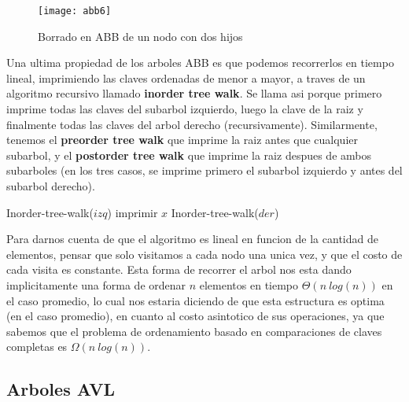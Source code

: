 \documentclass[10pt,a4paper]{article}
\begin{document}
\begin{figure}[h]
	\centering
	\texttt{[image: abb6]}
	\caption{Borrado en ABB de un nodo con dos hijos}
	\label{drivers1}
\end{figure}


Una ultima propiedad de los arboles ABB es que podemos recorrerlos en tiempo lineal, imprimiendo las claves ordenadas de menor a mayor, a traves de un algoritmo recursivo llamado \textbf{inorder tree walk}. Se llama asi porque primero imprime todas las claves del subarbol izquierdo, luego la clave de la raiz y finalmente todas las claves del arbol derecho (recursivamente). Similarmente, tenemos el \textbf{preorder tree walk} que imprime la raiz antes que cualquier subarbol, y el \textbf{postorder tree walk} que imprime la raiz despues de ambos subarboles (en los tres casos, se imprime primero el subarbol izquierdo y antes del subarbol derecho).

\begin{algorithm}[H]{}
	\begin{algorithmic}[1]
		\State Inorder-tree-walk($izq$)                      
		\State imprimir $x$
		\State Inorder-tree-walk($der$)
		\EndIf
		
		\medskip
	\end{algorithmic}
\end{algorithm}

Para darnos cuenta de que el algoritmo es lineal en funcion de la cantidad de elementos, pensar que solo visitamos a cada nodo una unica vez, y que el costo de cada visita es constante. Esta forma de recorrer el arbol nos esta dando implicitamente una forma de ordenar $n$ elementos en tiempo $\Theta(n~log(n))$ en el caso promedio, lo cual nos estaria diciendo de que esta estructura es optima (en el caso promedio), en cuanto al costo asintotico de sus operaciones, ya que sabemos que el problema de ordenamiento basado en comparaciones de claves completas es $\Omega(n~log(n))$.
\newpage

\subsection{Arboles AVL}
\end{document}
